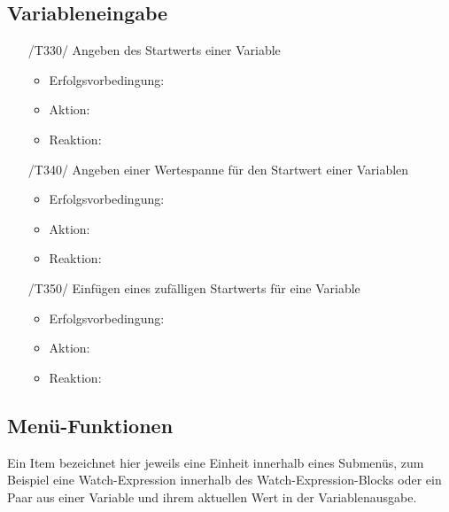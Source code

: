 \documentclass[parskip=full]{scrartcl}
\begin{document}
\newpage
\subsection{Variableneingabe}



\begin{itemize}

\item[/T330/] Angeben des Startwerts einer Variable
		\begin{itemize}
		\item Erfolgsvorbedingung:
		\item Aktion:
		\item Reaktion:		
		\end{itemize}	
	
\item[/T340/] Angeben einer Wertespanne für den Startwert einer Variablen
		\begin{itemize}
		\item Erfolgsvorbedingung:
		\item Aktion:
		\item Reaktion:		
		\end{itemize}	
	
\item[/T350/] Einfügen eines zufälligen Startwerts für eine Variable
		\begin{itemize}
		\item Erfolgsvorbedingung:
		\item Aktion:
		\item Reaktion:		
		\end{itemize}	
	
\end{itemize}

\subsection{Menü-Funktionen}

Ein Item bezeichnet hier jeweils eine Einheit innerhalb eines Submenüs, zum Beispiel eine Watch-Expression innerhalb des Watch-Expression-Blocks oder ein Paar aus einer Variable und ihrem aktuellen Wert in der Variablenausgabe.
\end{document}
